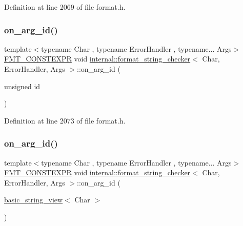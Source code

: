 Definition at line 2069 of file format.\+h.

\mbox{\label{classinternal_1_1format__string__checker_ae316eacf72218eeaf2b15899d548a00b}} 
\subsubsection{\texorpdfstring{on\+\_\+arg\+\_\+id()}{on\_arg\_id()}\hspace{0.1cm}{\footnotesize\ttfamily [2/3]}}
{\footnotesize\ttfamily template$<$typename Char , typename Error\+Handler , typename... Args$>$ \\
\hyperlink{core_8h_a69201cb276383873487bf68b4ef8b4cd}{F\+M\+T\+\_\+\+C\+O\+N\+S\+T\+E\+X\+PR} void \hyperlink{classinternal_1_1format__string__checker}{internal\+::format\+\_\+string\+\_\+checker}$<$ Char, Error\+Handler, Args $>$\+::on\+\_\+arg\+\_\+id (\begin{DoxyParamCaption}\item[{unsigned}]{id }\end{DoxyParamCaption})\hspace{0.3cm}{\ttfamily [inline]}}



Definition at line 2073 of file format.\+h.

\mbox{\label{classinternal_1_1format__string__checker_a32971d1bbff2686a400f2edba4473d8a}} 
\subsubsection{\texorpdfstring{on\+\_\+arg\+\_\+id()}{on\_arg\_id()}\hspace{0.1cm}{\footnotesize\ttfamily [3/3]}}
{\footnotesize\ttfamily template$<$typename Char , typename Error\+Handler , typename... Args$>$ \\
\hyperlink{core_8h_a69201cb276383873487bf68b4ef8b4cd}{F\+M\+T\+\_\+\+C\+O\+N\+S\+T\+E\+X\+PR} void \hyperlink{classinternal_1_1format__string__checker}{internal\+::format\+\_\+string\+\_\+checker}$<$ Char, Error\+Handler, Args $>$\+::on\+\_\+arg\+\_\+id (\begin{DoxyParamCaption}\item[{\hyperlink{classbasic__string__view}{basic\+\_\+string\+\_\+view}$<$ Char $>$}]{ }\end{DoxyParamCaption})\hspace{0.3cm}{\ttfamily [inline]}}



